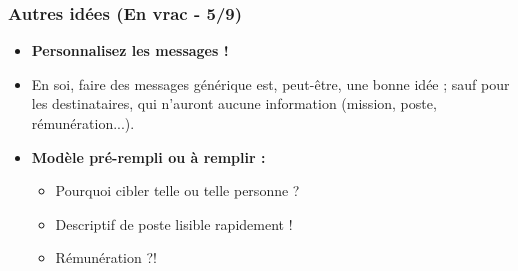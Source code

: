 \documentclass[slidetop,11pt]{beamer}
\begin{document}
\begin{frame}
	\frametitle{Autres id{\'e}es (En vrac - 5/9)}
	\begin{itemize}
		\item \textbf{Personnalisez les messages !}
		\item En soi, faire des messages g{\'e}n{\'e}rique est, peut-{\^e}tre, une bonne id{\'e}e ; 
			sauf pour les destinataires, qui n'auront aucune information (mission, poste, r{\'e}mun{\'e}ration...). 
		\item \textbf{Mod{\`e}le pr{\'e}-rempli ou {\`a} remplir : }
		\begin{itemize}
			\item Pourquoi cibler telle ou telle personne ?
			\item Descriptif de poste lisible rapidement !
			\item R{\'e}mun{\'e}ration ?!
		\end{itemize}
	\end{itemize} 
\end{frame}
\end{document}
